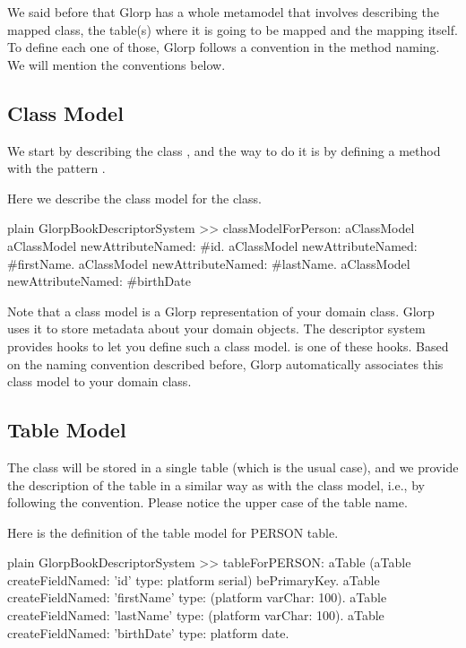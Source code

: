 \documentclass[10pt,twoside,english]{_support/latex/sbabook/sbabook}
\begin{document}
We said before that Glorp has a whole metamodel that involves describing the
mapped class, the table(s) where it is going to be mapped and the mapping
itself. To define each one of those, Glorp follows a convention in
the method naming. We will mention the conventions below.
\subsection{Class Model}
We start by describing the class , and the way to
do it is by defining a method with the pattern .

Here we describe the class model for the  class.

\begin{displaycode}{plain}
GlorpBookDescriptorSystem >> classModelForPerson: aClassModel
	aClassModel newAttributeNamed: #id.
	aClassModel newAttributeNamed: #firstName.
	aClassModel newAttributeNamed: #lastName.
	aClassModel newAttributeNamed: #birthDate
\end{displaycode}

Note that a class model is a Glorp representation of your domain class. Glorp uses it to
store metadata about your domain objects. The descriptor system provides hooks to let you define
such a class model.  is one of these hooks. Based on the naming convention described
before, Glorp automatically associates this class model to your domain class.
\subsection{Table Model}
The class  will be stored in a single table (which is the usual case), and we
provide the description of the table in a similar way as with the class
model, i.e., by following the  convention.
Please notice the upper case of the table name.

Here is the definition of the table model for PERSON table.

\begin{displaycode}{plain}
GlorpBookDescriptorSystem >> tableForPERSON: aTable
	(aTable createFieldNamed: 'id' type: platform serial)
		bePrimaryKey.
	aTable
		createFieldNamed: 'firstName'
		type: (platform varChar: 100).
	aTable
		createFieldNamed: 'lastName'
		type: (platform varChar: 100).
	aTable
		createFieldNamed: 'birthDate'
		type: platform date.
\end{displaycode}
\end{document}
